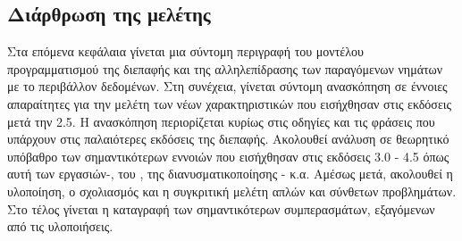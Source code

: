 \newpage
\subsection{Διάρθρωση της μελέτης}
Στα επόμενα κεφάλαια γίνεται μια σύντομη περιγραφή του μοντέλου προγραμματισμού της διεπαφής
\emph{} και της αλληλεπίδρασης των παραγόμενων νημάτων με το περιβάλλον δεδομένων.
Στη συνέχεια, γίνεται σύντομη ανασκόπηση σε έννοιες απαραίτητες για την μελέτη των νέων χαρακτηριστικών που
εισήχθησαν στις εκδόσεις μετά την 2.5. Η ανασκόπηση περιορίζεται κυρίως στις οδηγίες και τις
φράσεις που υπάρχουν στις παλαιότερες εκδόσεις της διεπαφής. Ακολουθεί ανάλυση σε
θεωρητικό υπόβαθρο των σημαντικότερων εννοιών που εισήχθησαν στις εκδόσεις 3.0 - 4.5 όπως αυτή των
εργασιών-\emph{}, του \emph{}, της διανυσματικοποίησης
-\emph{} κ.α. Αμέσως μετά, ακολουθεί η υλοποίηση, ο σχολιασμός και η συγκριτική
μελέτη απλών και σύνθετων προβλημάτων. Στο τέλος γίνεται η καταγραφή των σημαντικότερων
συμπερασμάτων, εξαγόμενων από τις υλοποιήσεις.